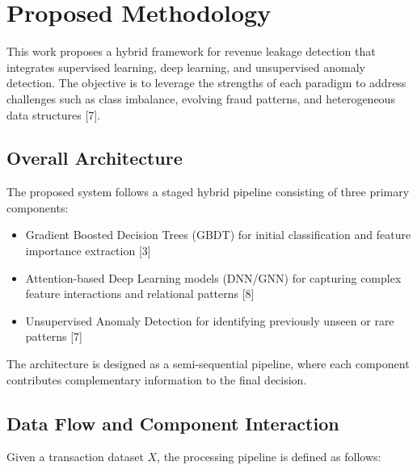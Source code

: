 \documentclass[conference]{IEEEtran}
\begin{document}
\section{Proposed Methodology}

This work proposes a hybrid framework for revenue leakage detection that integrates supervised learning, deep learning, and unsupervised anomaly detection. The objective is to leverage the strengths of each paradigm to address challenges such as class imbalance, evolving fraud patterns, and heterogeneous data structures [7].

\subsection{Overall Architecture}

The proposed system follows a staged hybrid pipeline consisting of three primary components:
\begin{itemize}
    \item Gradient Boosted Decision Trees (GBDT) for initial classification and feature importance extraction [3]
    \item Attention-based Deep Learning models (DNN/GNN) for capturing complex feature interactions and relational patterns [8]
    \item Unsupervised Anomaly Detection for identifying previously unseen or rare patterns [7]
\end{itemize}

The architecture is designed as a semi-sequential pipeline, where each component contributes complementary information to the final decision.

\subsection{Data Flow and Component Interaction}

Given a transaction dataset $X$, the processing pipeline is defined as follows:
\end{document}
